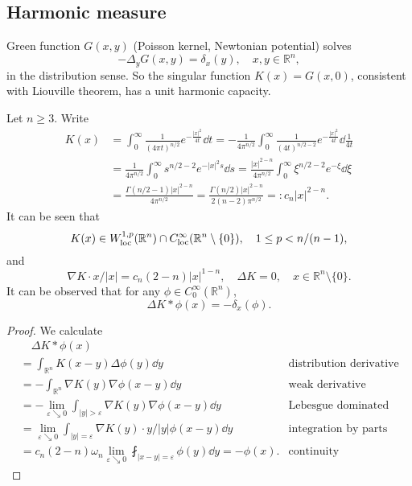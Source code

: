 \subsection{Harmonic measure}

Green function $G(x,y)$ (Poisson kernel, Newtonian potential) solves 
\[
-\Delta_y G(x,y) = \delta_x(y), \quad x,y\in\mathbb R^n,
\]
in the distribution sense. 
So the singular function $K(x) = G(x,0)$, consistent with Liouville theorem,
has a unit harmonic capacity.

\begin{proposition}
  Let $n\geq3$. 
  Write
  \begin{align*}
    K(x) &= \int_0^\infty\frac{1}{(4\pi t)^{n/2}}e^{-\frac{|x|^2}{4t}}\dd t 
    = - \frac{1}{4\pi^{n/2}}\int_0^\infty\frac{1}{(4t)^{n/2-2}}e^{-\frac{|x|^2}{4t}}\dd\frac1{4t}\\
    &= \frac1{4\pi^{n/2}}\int_0^\infty s^{n/2-2}e^{-|x|^2s}\dd s
    = \frac{|x|^{2-n}}{4\pi^{n/2}}\int_0^\infty \xi^{n/2-2}e^{-\xi}\dd\xi \\
    &= \frac{\Gamma(n/2-1)|x|^{2-n}}{4\pi^{n/2}} = \frac{\Gamma(n/2)|x|^{2-n}}{2(n-2)\pi^{n/2}} =: c_n|x|^{2-n}.
  \end{align*}
  It can be seen that 
  \[
  K(x) \in W_{\operatorname*{loc}}^{1,p}(\mathbb R^n)\cap C_{\operatorname*{loc}}^\infty(\mathbb R^n\setminus \{0\}),
  \quad 1\leq p < n/(n-1),
  \]
  and 
  \[
  \nabla K\cdot x/|x| = c_n(2-n)|x|^{1-n},\quad \Delta K = 0, \quad x\in  \mathbb R^n\setminus\{0\}.
  \]
  It can be observed that for any $\phi\in C_0^\infty(\mathbb R^n)$,
  \[
  \Delta K*\phi (x) = -\delta_x(\phi).
  \]
\end{proposition}

\begin{proof}
  We calculate 
  \begin{align*}
    &\quad\Delta K*\phi(x)\\
    &= \int_{\mathbb R^n}K(x-y)\Delta\phi(y)\dd y & \text{distribution derivative}\\ 
    &= -\int_{\mathbb R^n}\nabla K(y)\nabla\phi(x-y)\dd y
    & \text{weak derivative}\\
    &= - \lim_{\varepsilon\searrow0}\int_{|y|>\varepsilon}\nabla K(y)\nabla \phi(x-y)\dd y
    & \text{Lebesgue dominated convergence theorem}\\
    &= \lim_{\varepsilon\searrow0}\int_{|y|=\varepsilon}\nabla K(y)\cdot y/|y|\phi(x-y)\dd y
    & \text{integration by parts}\\
    &= c_n(2-n)\omega_n\lim_{\varepsilon\searrow0}\fint_{|x-y|=\varepsilon}\phi(y)\dd y
    = -\phi(x).
    & \text{continuity}
  \end{align*}
\end{proof}

